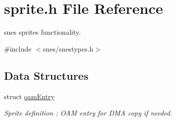 \hypertarget{a00350}{}\section{sprite.\+h File Reference}
\label{a00350}


snes sprites functionality.  


{\ttfamily \#include $<$snes/snestypes.\+h$>$}\newline
\subsection*{Data Structures}
\begin{DoxyCompactItemize}
\item 
struct \hyperlink{a00386}{oam\+Entry}
\begin{DoxyCompactList}\small\item\em Sprite definition \+: O\+AM entry for D\+MA copy if needed. \end{DoxyCompactList}\end{DoxyCompactItemize}
